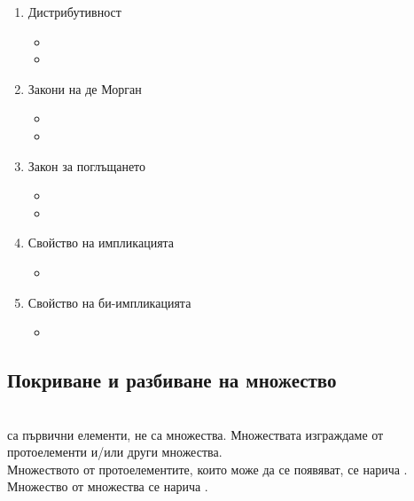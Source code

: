 \begin{enumerate}
\begin{itemize}
            \item {}
            \item {}
        \end{itemize}
    \item Дистрибутивност
        \begin{itemize}
            \item {}
            \item {}
        \end{itemize}
    \item Закони на де Морган
        \begin{itemize}
            \item {}
            \item {}
        \end{itemize}
    \item Закон за поглъщането
        \begin{itemize}
            \item {}
            \item {}
        \end{itemize}
    \item Свойство на импликацията
        \begin{itemize}
            \item {}
        \end{itemize}
    \item Свойство на би-импликацията
        \begin{itemize}
            \item {}
        \end{itemize}
\end{enumerate}

\subsection{Покриване и разбиване на множество}

 \\
 са първични елементи, не са множества. Множествата изграждаме от протоелементи и/или
други множества. \\
Множеството от протоелементите, които може да се появяват, се нарича . \\
Множество от множества се нарича . \\

